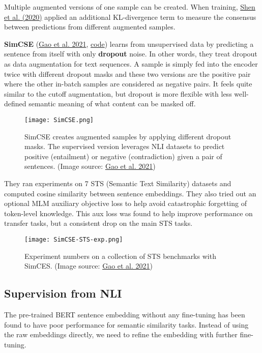 \documentclass[12pt]{article}
\begin{document}
Multiple augmented versions of one sample can be created. When training, \href{https://arxiv.org/abs/2009.13818}{Shen et al. (2020)} applied an additional KL-divergence term to measure the consensus between predictions from different augmented samples.

\textbf{SimCSE} (\href{https://arxiv.org/abs/2104.08821}{Gao et al. 2021}, \href{https://github.com/princeton-nlp/SimCSE}{code}) learns from unsupervised data by predicting a sentence from itself with only \textbf{dropout} noise. In other words, they treat dropout as data augmentation for text sequences. A sample is simply fed into the encoder twice with different dropout masks and these two versions are the positive pair where the other in-batch samples are considered as negative pairs. It feels quite similar to the cutoff augmentation, but dropout is more flexible with less well-defined semantic meaning of what content can be masked off.

\begin{figure}[H]
    \centering
    \texttt{[image: SimCSE.png]}
    \caption{SimCSE creates augmented samples by applying different dropout masks. The supervised version leverages NLI datasets to predict positive (entailment) or negative (contradiction) given a pair of sentences. (Image source: \href{https://arxiv.org/abs/2104.08821}{Gao et al. 2021})}
\end{figure}

They ran experiments on 7 STS (Semantic Text Similarity) datasets and computed cosine similarity between sentence embeddings. They also tried out an optional MLM auxiliary objective loss to help avoid catastrophic forgetting of token-level knowledge. This aux loss was found to help improve performance on transfer tasks, but a consistent drop on the main STS tasks.

\begin{figure}[H]
    \centering
    \texttt{[image: SimCSE-STS-exp.png]}
    \caption{Experiment numbers on a collection of STS benchmarks with SimCES. (Image source: \href{https://arxiv.org/abs/2104.08821}{Gao et al. 2021})}
\end{figure}

\subsection{Supervision from NLI}

The pre-trained BERT sentence embedding without any fine-tuning has been found to have poor performance for semantic similarity tasks. Instead of using the raw embeddings directly, we need to refine the embedding with further fine-tuning.
\end{document}
